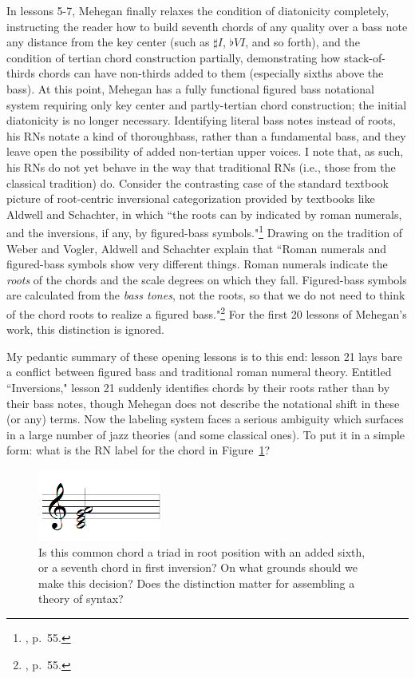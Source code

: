 In lessons 5-7, Mehegan finally relaxes the condition of diatonicity completely, instructing the reader how to build seventh chords of any quality over a bass note any distance from the key center (such as $\sharp I$, $\flat VI$, and so forth), and the condition of tertian chord construction partially, demonstrating how stack-of-thirds chords can have non-thirds added to them (especially sixths above the bass).  At this point, Mehegan has a fully functional figured bass notational system requiring only key center and partly-tertian chord construction; the initial diatonicity is no longer necessary.  Identifying literal bass notes instead of roots, his RNs notate a kind of thoroughbass, rather than a fundamental bass, and they leave open the possibility of added non-tertian upper voices.  I note that, as such, his RNs do not yet behave in the way that traditional RNs (i.e., those from the classical tradition) do.  Consider the contrasting case of the standard textbook picture of root-centric inversional categorization provided by textbooks like Aldwell and Schachter, in which ``the roots can by indicated by roman numerals, and the inversions, if any, by figured-bass symbols."\footnote{\cite{aldwell2003}, p.\ 55.}  Drawing on the tradition of Weber and Vogler, Aldwell and Schachter explain that ``Roman numerals and figured-bass symbols show very different things.  Roman numerals indicate the \emph{roots} of the chords and the scale degrees on which they fall.  Figured-bass symbols are calculated from the \emph{bass tones}, not the roots, so that we do not need to think of the chord roots to realize a figured bass."\footnote{\cite{aldwell2003}, p.\ 55.}  For the first 20 lessons of Mehegan's work, this distinction is ignored.

My pedantic summary of these opening lessons is to this end: lesson 21 lays bare a conflict between figured bass and traditional roman numeral theory.  Entitled ``Inversions," lesson 21 suddenly identifies chords by their roots rather than by their bass notes, though Mehegan does not describe the notational shift in these (or any) terms.  Now the labeling system faces a serious ambiguity which surfaces in a large number of jazz theories (and some classical ones).  To put it in a simple form: what is the RN label for the chord in Figure~\ref{am_bigu}?
\begin{figure}
	\centering
	\caption{Is this common chord a triad in root position with an added sixth, or a seventh chord in first inversion?  On what grounds should we make this decision?  Does the distinction matter for assembling a theory of syntax?}
	\label{am_bigu}
	\includegraphics[width=1.6in]{diss_prospectus_cega.png}
\end{figure}

